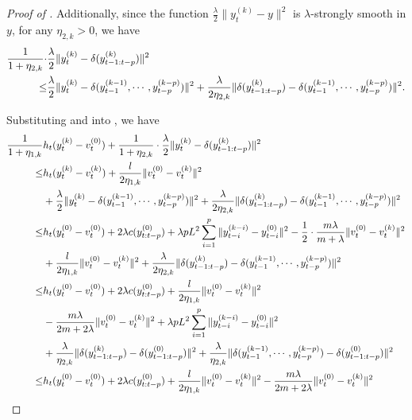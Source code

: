 \begin{proof}[Proof of ]
Additionally, since the function $\frac{\lambda}{2}\|y_t^{(k)}-y\|^2$ is $\lambda$-strongly smooth in $y$, for any $\eta_{2,k}>0$, we have
\begin{align}\label{appendix.c.3}
    \frac{1}{1+\eta_{2,k}}\cdot&\frac{\lambda}{2}\|y_t^{(k)}-\delta(y_{t-1:t-p}^{(k)})\|^2\notag\\
\le&\frac{\lambda}{2}\|y_t^{(k)}-\delta(y_{t-1}^{(k-1)},\cdots,y_{t-p}^{(k-p)})\|^2+\frac{\lambda}{2\eta_{2,k}}\|\delta(y_{t-1:t-p}^{(k)})-\delta(y_{t-1}^{(k-1)},\cdots,y_{t-p}^{(k-p)})\|^2.
\end{align}

Substituting  and  into , we have 
\begin{subequations}\allowdisplaybreaks
\begin{align}
    \frac{1}{1+\eta_{1,k}}&h_t(y_t^{(k)}-v_t^{(0)})+\frac{1}{1+\eta_{2,k}}\cdot\frac{\lambda}{2}\|y_t^{(k)}-\delta(y_{t-1:t-p}^{(k)})\|^2\notag\\
\le&h_t(y_t^{(k)}-v_t^{(k)})+\frac{l}{2\eta_{1,k}}\|v_t^{(0)}-v_t^{(k)}\|^2\notag\\
&+\frac{\lambda}{2}\|y_t^{(k)}-\delta(y_{t-1}^{(k-1)},\cdots,y_{t-p}^{(k-p)})\|^2+\frac{\lambda}{2\eta_{2,k}}\|\delta(y_{t-1:t-p}^{(k)})-\delta(y_{t-1}^{(k-1)},\cdots,y_{t-p}^{(k-p)})\|^2\notag\\
\le&h_t(y_t^{(0)}-v_t^{(0)})+2\lambda c(y_{t:t-p}^{(0)})+\lambda pL^2\sum_{i=1}^p\|y_{t-i}^{(k-i)}-y_{t-i}^{(0)}\|^2-\frac{1}{2}\cdot\frac{m\lambda}{m+\lambda}\|v_t^{(0)}-v_t^{(k)}\|^2\notag\\
&+\frac{l}{2\eta_{1,k}}\|v_t^{(0)}-v_t^{(k)}\|^2+\frac{\lambda}{2\eta_{2,k}}\|\delta(y_{t-1:t-p}^{(k)})-\delta(y_{t-1}^{(k-1)},\cdots,y_{t-p}^{(k-p)})\|^2\notag\\
\le&h_t(y_t^{(0)}-v_t^{(0)})+2\lambda c(y_{t:t-p}^{(0)})+\frac{l}{2\eta_{1,k}}\|v_t^{(0)}-v_t^{(k)}\|^2\notag\\
&-\frac{m\lambda}{2m+2\lambda}\|v_t^{(0)}-v_t^{(k)}\|^2+\lambda pL^2\sum_{i=1}^p\|y_{t-i}^{(k-i)}-y_{t-i}^{(0)}\|^2\notag\\
&+\frac{\lambda}{\eta_{2,k}}\|\delta(y_{t-1:t-p}^{(k)})-\delta(y_{t-1:t-p}^{(0)})\|^2+\frac{\lambda}{\eta_{2,k}}\|\delta(y_{t-1}^{(k-1)},\cdots,y_{t-p}^{(k-p)})-\delta(y_{t-1:t-p}^{(0)})\|^2\label{appendix.c.19.1}\\
\le&h_t(y_t^{(0)}-v_t^{(0)})+2\lambda c(y_{t:t-p}^{(0)})+\frac{l}{2\eta_{1,k}}\|v_t^{(0)}-v_t^{(k)}\|^2-\frac{m\lambda}{2m+2\lambda}\|v_t^{(0)}-v_t^{(k)}\|^2\notag\\

\end{align}
\end{subequations}
\end{proof}
